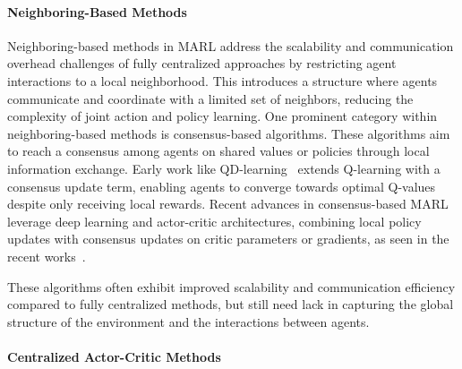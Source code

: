 \documentclass[sigconf]{acmart}
\begin{document}
\paragraph{Neighboring-Based Methods}
Neighboring-based methods in MARL address the scalability and communication overhead challenges of fully centralized approaches by restricting agent interactions to a local neighborhood. 
This introduces a structure where agents communicate and coordinate with a limited set of neighbors, reducing the complexity of joint action and policy learning.
%
One prominent category within neighboring-based methods is consensus-based algorithms. 
These algorithms aim to reach a consensus among agents on shared values or policies through local information exchange. 
Early work like QD-learning~\cite{kar2012qd} extends Q-learning with a consensus update term, 
enabling agents to converge towards optimal Q-values despite only receiving local rewards.
%  
Recent advances in consensus-based MARL leverage deep learning and actor-critic architectures, 
combining local policy updates with consensus updates on critic parameters or gradients, 
as seen in the recent works~\cite{7434032,pennesi2010distributed,zhang2018fully,DBLP:journals/jmlr/CiosekW20}.

These algorithms often exhibit improved scalability and communication efficiency compared to fully centralized methods, 
but still need lack in capturing the global structure of the environment and the interactions between agents.
\paragraph{Centralized Actor-Critic Methods}
\end{document}
